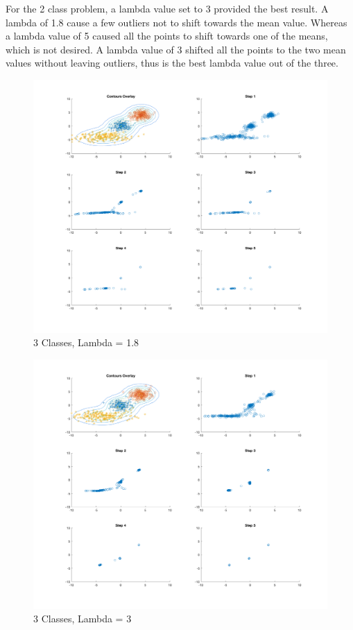 For the 2 class problem, a lambda value set to 3 provided the best result. A lambda of 1.8 cause a few outliers not to shift towards the mean value.
Whereas a lambda value of 5 caused all the points to shift towards one of the means, which is not desired.
A lambda value of 3 shifted all the points to the two mean values without leaving outliers, thus is the best lambda value out of the three.

\begin{figure}[H]
    \includegraphics[width=\linewidth]{../../pracs/week5/images/q3_3class_1_8}
    \centering
    \caption{3 Classes, Lambda = 1.8}
\end{figure}

\begin{figure}[H]
    \includegraphics[width=\linewidth]{../../pracs/week5/images/q3_3class_3}
    \centering
    \caption{3 Classes, Lambda = 3}
\end{figure}

